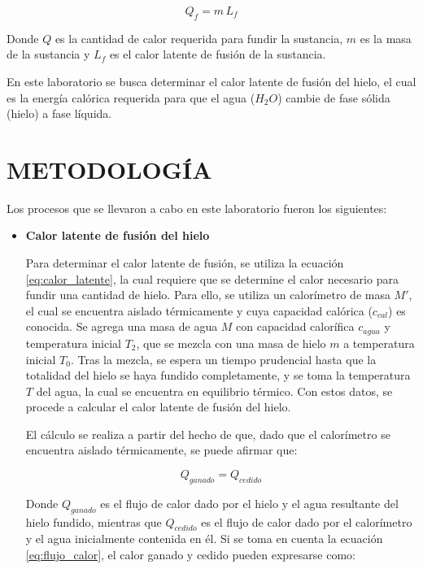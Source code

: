 \documentclass[10pt]{article}
\begin{document}
\begin{multicols*}{2}
    \begin{equation}
        Q_f = m \, L_f
        \label{eq:calor_latente}
    \end{equation}

    Donde $Q$ es la cantidad de calor requerida para fundir la sustancia, $m$ es la masa de la sustancia y $L_f$ es el calor latente de fusión de la sustancia.

    En este laboratorio se busca determinar el calor latente de fusión del hielo, el cual es la energía calórica requerida para que el agua ($H_2O$) cambie de fase sólida (hielo) a fase líquida.


    \section{\small METODOLOGÍA}
    Los procesos que se llevaron a cabo en este laboratorio fueron los siguientes:

    \begin{itemize}
        \item \textbf{Calor latente de fusión del hielo}

            Para determinar el calor latente de fusión, se utiliza la ecuación \ref{eq:calor_latente}, la cual requiere que se determine el calor necesario para fundir una cantidad de hielo. Para ello, se utiliza un calorímetro de masa $M'$, el cual se encuentra aislado térmicamente y cuya capacidad calórica ($c_{cal}$) es conocida. Se agrega una masa de agua $M$ con capacidad calorífica $c_{agua}$ y temperatura inicial $T_2$, que se mezcla con una masa de hielo $m$ a temperatura inicial $T_0$. Tras la mezcla, se espera un tiempo prudencial hasta que la totalidad del hielo se haya fundido completamente, y se toma la temperatura $T$ del agua, la cual se encuentra en equilibrio térmico. Con estos datos, se procede a calcular el calor latente de fusión del hielo.

            El cálculo se realiza a partir del hecho de que, dado que el calorímetro se encuentra aislado térmicamente, se puede afirmar que:
            
            \begin{equation}
                Q_{ganado} = Q_{cedido}
                \label{eq:calor_latente_1}
            \end{equation}

            Donde $Q_{ganado}$ es el flujo de calor dado por el hielo y el agua resultante del hielo fundido, mientras que $Q_{cedido}$ es el flujo de calor dado por el calorímetro y el agua inicialmente contenida en él. Si se toma en cuenta la ecuación \ref{eq:flujo_calor}, el calor ganado y cedido pueden expresarse como:


\end{itemize}
\end{multicols*}
\end{document}
